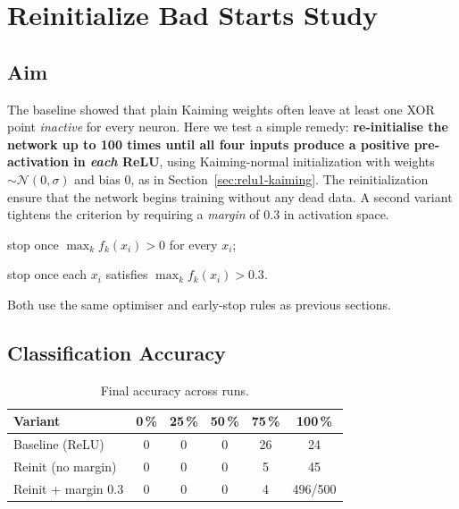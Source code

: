 \section{Reinitialize Bad Starts Study}
\label{sec:relu1-reinit}

\subsection*{Aim}
The baseline showed that plain Kaiming weights often leave at least one
XOR point \emph{inactive} for every neuron.  
Here we test a simple remedy: \textbf{re-initialise the network up to 100 times 
until all four inputs produce a positive pre-activation in \emph{each} ReLU}, 
using Kaiming-normal initialization with weights \(\sim \mathcal{N}(0, \sigma)\) and bias \(0\), as in Section~\ref{sec:relu1-kaiming}.
The reinitialization ensure that the network begins training without any dead data.
A second variant tightens the criterion by requiring a \emph{margin}
of $0.3$ in activation space.

\begin{description}[leftmargin=2em,style=sameline]
  \item[\texttt{relu1\_reinit}]   stop once \(\max_k f_k(x_i) > 0\) for every \(x_i\);
  \item[\texttt{relu1\_reinit\_margin}] stop once each \(x_i\) satisfies
        \(\max_k f_k(x_i) > 0.3\).
\end{description}
Both use the same optimiser and early-stop rules as previous sections.

\subsection*{Classification Accuracy}

\begin{table}[ht]
\centering
\caption{Final accuracy across runs.}
\label{tab:relu1-reinit-accuracy}
\begin{tabular}{lccccc}
\toprule
Variant & 0\,\% & 25\,\% & 50\,\% & 75\,\% & 100\,\% \\
\midrule
Baseline (ReLU)       & 0 & 0 & 0 & 26 & 24 \\
Reinit (no margin)    & 0 & 0 & 0 & 5  & 45 \\
Reinit + margin 0.3   & 0 & 0 & 0 & 4  & 496/500 \\
\bottomrule
\end{tabular}
\end{table}

